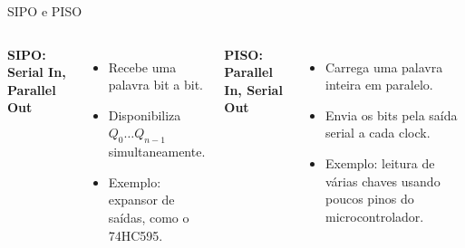 \begin{frame}{SIPO e PISO}
\begin{columns}[T]
\textbf{SIPO: Serial In, Parallel Out}
\begin{itemize}
  \item Recebe uma palavra bit a bit.
  \item Disponibiliza \(Q_0\ldots Q_{n-1}\) simultaneamente.
  \item Exemplo: expansor de saídas, como o 74HC595.
\end{itemize}

\textbf{PISO: Parallel In, Serial Out}
\begin{itemize}
  \item Carrega uma palavra inteira em paralelo.
  \item Envia os bits pela saída serial a cada clock.
  \item Exemplo: leitura de várias chaves usando poucos pinos do microcontrolador.
\end{itemize}
\end{columns}
\end{frame}
